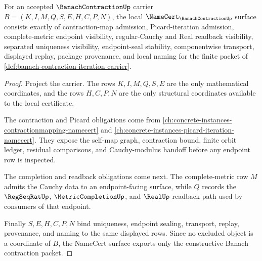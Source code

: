 \begin{theorem}
\label{thm:banach-contraction-namecert-obligations}
For an accepted $\BanachContractionUp$ carrier $B=(K,I,M,Q,S,E,H,C,P,N)$, the local $\NameCert_{\BanachContractionUp}$ surface consists exactly of contraction-map admission, Picard-iteration admission, complete-metric endpoint visibility, regular-Cauchy and Real readback visibility, separated uniqueness visibility, endpoint-seal stability, componentwise transport, displayed replay, package provenance, and local naming for the finite packet of \autoref{def:banach-contraction-iteration-carrier}.
\end{theorem}
\begin{proof}
Project the carrier. The rows $K,I,M,Q,S,E$ are the only mathematical coordinates, and the rows $H,C,P,N$ are the only structural coordinates available to the local certificate.

The contraction and Picard obligations come from \autoref{ch:concrete-instances-contractionmapping-namecert} and \autoref{ch:concrete-instances-picard-iteration-namecert}. They expose the self-map graph, contraction bound, finite orbit ledger, residual comparisons, and Cauchy-modulus handoff before any endpoint row is inspected.

The completion and readback obligations come next. The complete-metric row $M$ admits the Cauchy data to an endpoint-facing surface, while $Q$ records the $\RegSeqRatUp$, $\MetricCompletionUp$, and $\RealUp$ readback path used by consumers of that endpoint.

Finally $S,E,H,C,P,N$ bind uniqueness, endpoint sealing, transport, replay, provenance, and naming to the same displayed rows. Since no excluded object is a coordinate of $B$, the NameCert surface exports only the constructive Banach contraction packet.
\end{proof}

